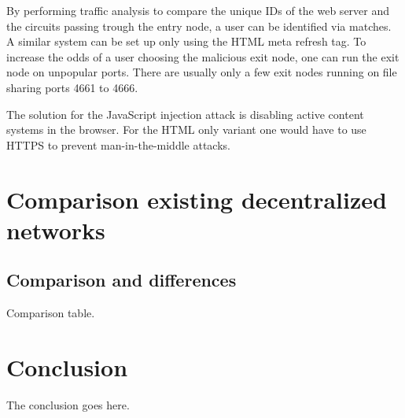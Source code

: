 \documentclass[journal]{IEEEtran}
\begin{document}
			By performing traffic analysis to compare the unique IDs of the web server and the circuits passing trough the entry node, a user can be identified via matches. A similar system can be set up only using the HTML meta refresh tag. To increase the odds of a user choosing the malicious exit node, one can run the exit node on unpopular ports. There are usually only a few exit nodes running on file sharing ports 4661 to 4666.
		
			The solution for the JavaScript injection attack is disabling active content systems in the browser. For the HTML only variant one would have to use HTTPS to prevent man-in-the-middle attacks.
	
	\section{Comparison existing decentralized  networks}
		
		
		\subsection{Comparison and differences}
			Comparison table.
	
	\section{Conclusion}
		The conclusion goes here.

	\appendices
			
			
			
			
			
			
\end{document}
